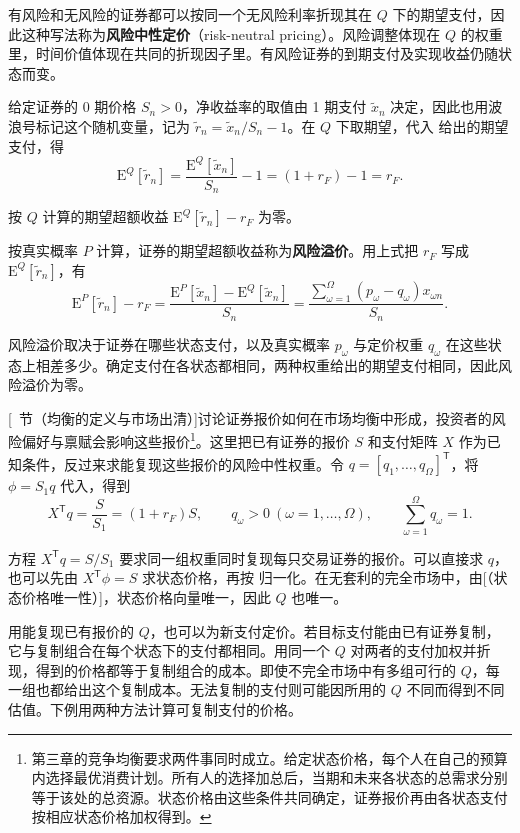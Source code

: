 有风险和无风险的证券都可以按同一个无风险利率折现其在 $Q$ 下的期望支付，因此这种写法称为\textbf{风险中性定价}（risk-neutral pricing）。风险调整体现在 $Q$ 的权重里，时间价值体现在共同的折现因子里。有风险证券的到期支付及实现收益仍随状态而变。

给定证券的 0 期价格 $S_n>0$，净收益率的取值由 1 期支付 $\tilde x_n$ 决定，因此也用波浪号标记这个随机变量，记为 $\tilde r_n=\tilde x_n/S_n-1$。在 $Q$ 下取期望，代入 给出的期望支付，得
\[
 \mathrm E^Q[\tilde r_n]
 =\frac{\mathrm E^Q[\tilde x_n]}{S_n}-1
 =(1+r_F)-1=r_F.
\]

按 $Q$ 计算的期望超额收益 $\mathrm E^Q[\tilde r_n]-r_F$ 为零。

按真实概率 $P$ 计算，证券的期望超额收益称为\textbf{风险溢价}。用上式把 $r_F$ 写成 $\mathrm E^Q[\tilde r_n]$，有
\[
 \mathrm E^P[\tilde r_n]-r_F
 =\frac{\mathrm E^P[\tilde x_n]-\mathrm E^Q[\tilde x_n]}{S_n}
 =\frac{\sum_{\omega=1}^{\Omega}(p_\omega-q_\omega)x_{\omega n}}{S_n}.
\]

风险溢价取决于证券在哪些状态支付，以及真实概率 $p_\omega$ 与定价权重 $q_\omega$ 在这些状态上相差多少。确定支付在各状态都相同，两种权重给出的期望支付相同，因此风险溢价为零。

[~节（均衡的定义与市场出清）]讨论证券报价如何在市场均衡中形成，投资者的风险偏好与禀赋会影响这些报价\footnote{第三章的竞争均衡要求两件事同时成立。给定状态价格，每个人在自己的预算内选择最优消费计划。所有人的选择加总后，当期和未来各状态的总需求分别等于该处的总资源。状态价格由这些条件共同确定，证券报价再由各状态支付按相应状态价格加权得到。}。这里把已有证券的报价 $S$ 和支付矩阵 $X$ 作为已知条件，反过来求能复现这些报价的风险中性权重。令 $q=[q_1,\ldots,q_\Omega]^{\mathsf T}$，将 $\phi=S_1q$ 代入，得到
\[
 X^{\mathsf T}q=\frac{S}{S_1}=(1+r_F)S,
 \qquad q_\omega>0\ (\omega=1,\ldots,\Omega),\qquad
 \sum_{\omega=1}^{\Omega}q_\omega=1.
\]

方程 $X^{\mathsf T}q=S/S_1$ 要求同一组权重同时复现每只交易证券的报价。可以直接求 $q$，也可以先由 $X^{\mathsf T}\phi=S$ 求状态价格，再按 归一化。在无套利的完全市场中，由[（状态价格唯一性）]，状态价格向量唯一，因此 $Q$ 也唯一。

用能复现已有报价的 $Q$，也可以为新支付定价。若目标支付能由已有证券复制，它与复制组合在每个状态下的支付都相同。用同一个 $Q$ 对两者的支付加权并折现，得到的价格都等于复制组合的成本。即使不完全市场中有多组可行的 $Q$，每一组也都给出这个复制成本。无法复制的支付则可能因所用的 $Q$ 不同而得到不同估值。下例用两种方法计算可复制支付的价格。

